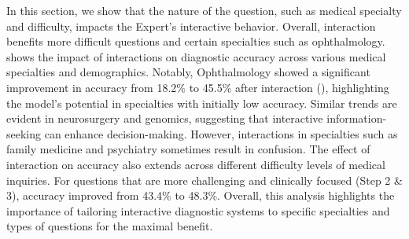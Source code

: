 In this section, we show that the nature of the question, such as medical specialty and difficulty, impacts the Expert's interactive behavior. Overall, interaction benefits more difficult questions and certain specialties such as ophthalmology.
 shows the impact of interactions on diagnostic accuracy across various medical specialties and demographics. Notably, Ophthalmology showed a significant improvement in accuracy from 18.2\% to 45.5\% after interaction (), highlighting the model's potential in specialties with initially low accuracy. Similar trends are evident in neurosurgery and genomics, suggesting that interactive information-seeking can enhance decision-making. However, interactions in specialties such as family medicine and psychiatry sometimes result in confusion. The effect of interaction on accuracy also extends across different difficulty levels of medical inquiries. For questions that are more challenging and clinically focused (Step 2 \& 3), accuracy improved from 43.4\% to 48.3\%. 
Overall, this analysis highlights the importance of tailoring interactive diagnostic systems to specific specialties and types of questions for the maximal benefit.

